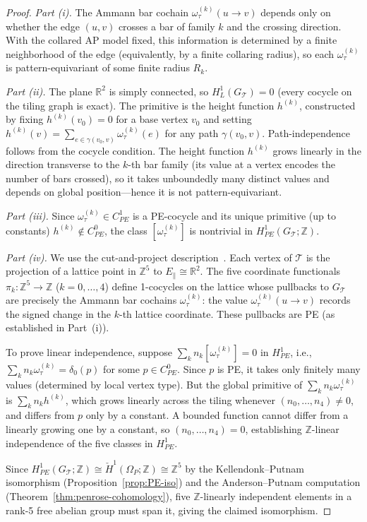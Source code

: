 \documentclass[12pt]{article}
\theoremstyle{definition}
\theoremstyle{remark}
\newcommand{\RR}{\mathbb{R}}
\newcommand{\ZZ}{\mathbb{Z}}
\newcommand{\Hcech}{\check{H}}
\begin{document}
\begin{proof}
\emph{Part (i).} The Ammann bar cochain $\omega_\tau^{(k)}(u \to v)$ depends only on whether the edge $(u,v)$ crosses a bar of family $k$ and the crossing direction. With the collared AP model fixed, this information is determined by a finite neighborhood of the edge (equivalently, by a finite collaring radius), so each $\omega_\tau^{(k)}$ is pattern-equivariant of some finite radius $R_k$.

\emph{Part (ii).} The plane $\RR^2$ is simply connected, so $H^1_L(G_{\mathcal{T}}) = 0$ (every cocycle on the tiling graph is exact). The primitive is the height function $h^{(k)}$, constructed by fixing $h^{(k)}(v_0) = 0$ for a base vertex $v_0$ and setting $h^{(k)}(v) = \sum_{e \in \gamma(v_0, v)} \omega_\tau^{(k)}(e)$ for any path $\gamma(v_0, v)$. Path-independence follows from the cocycle condition. The height function $h^{(k)}$ grows linearly in the direction transverse to the $k$-th bar family (its value at a vertex encodes the number of bars crossed), so it takes unboundedly many distinct values and depends on global position---hence it is not pattern-equivariant.

\emph{Part (iii).} Since $\omega_\tau^{(k)} \in C^1_{PE}$ is a PE-cocycle and its unique primitive (up to constants) $h^{(k)} \notin C^0_{PE}$, the class $[\omega_\tau^{(k)}]$ is nontrivial in $H^1_{PE}(G_{\mathcal{T}}; \ZZ)$.

\emph{Part (iv).} We use the cut-and-project description~\cite{BaakeGrimm2013,Forrest2002}. Each vertex of $\mathcal{T}$ is the projection of a lattice point in $\ZZ^5$ to $E_\parallel \cong \RR^2$. The five coordinate functionals $\pi_k: \ZZ^5 \to \ZZ$ ($k = 0,\ldots,4$) define 1-cocycles on the lattice whose pullbacks to $G_{\mathcal{T}}$ are precisely the Ammann bar cochains $\omega_\tau^{(k)}$: the value $\omega_\tau^{(k)}(u \to v)$ records the signed change in the $k$-th lattice coordinate. These pullbacks are PE (as established in Part~(i)).

To prove linear independence, suppose $\sum_k n_k [\omega_\tau^{(k)}] = 0$ in $H^1_{PE}$, i.e., $\sum_k n_k \omega_\tau^{(k)} = \delta_0(p)$ for some $p \in C^0_{PE}$. Since $p$ is PE, it takes only finitely many values (determined by local vertex type). But the global primitive of $\sum_k n_k \omega_\tau^{(k)}$ is $\sum_k n_k h^{(k)}$, which grows linearly across the tiling whenever $(n_0,\ldots,n_4) \neq 0$, and differs from $p$ only by a constant. A bounded function cannot differ from a linearly growing one by a constant, so $(n_0,\ldots,n_4) = 0$, establishing $\ZZ$-linear independence of the five classes in $H^1_{PE}$.

Since $H^1_{PE}(G_{\mathcal{T}};\ZZ) \cong \Hcech^1(\Omega_P;\ZZ) \cong \ZZ^5$ by the Kellendonk--Putnam isomorphism (Proposition~\ref{prop:PE-iso}) and the Anderson--Putnam computation (Theorem~\ref{thm:penrose-cohomology}), five $\ZZ$-linearly independent elements in a rank-5 free abelian group must span it, giving the claimed isomorphism.
\end{proof}
\end{document}
